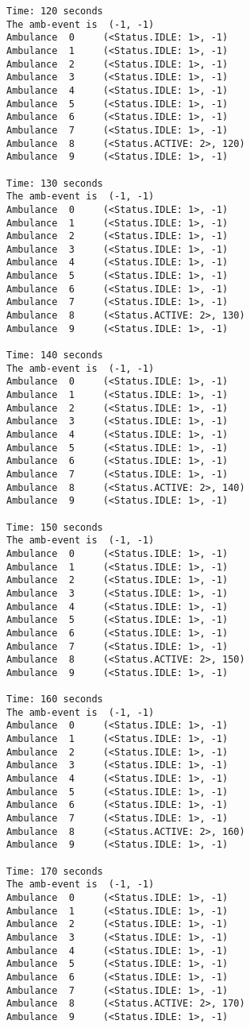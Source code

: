 \documentclass[11pt]{article}
\begin{document}
\begin{Verbatim}[commandchars=\\\{\}]
Time: 120 seconds
The amb-event is  (-1, -1)
Ambulance  0	 (<Status.IDLE: 1>, -1)
Ambulance  1	 (<Status.IDLE: 1>, -1)
Ambulance  2	 (<Status.IDLE: 1>, -1)
Ambulance  3	 (<Status.IDLE: 1>, -1)
Ambulance  4	 (<Status.IDLE: 1>, -1)
Ambulance  5	 (<Status.IDLE: 1>, -1)
Ambulance  6	 (<Status.IDLE: 1>, -1)
Ambulance  7	 (<Status.IDLE: 1>, -1)
Ambulance  8	 (<Status.ACTIVE: 2>, 120)
Ambulance  9	 (<Status.IDLE: 1>, -1)

Time: 130 seconds
The amb-event is  (-1, -1)
Ambulance  0	 (<Status.IDLE: 1>, -1)
Ambulance  1	 (<Status.IDLE: 1>, -1)
Ambulance  2	 (<Status.IDLE: 1>, -1)
Ambulance  3	 (<Status.IDLE: 1>, -1)
Ambulance  4	 (<Status.IDLE: 1>, -1)
Ambulance  5	 (<Status.IDLE: 1>, -1)
Ambulance  6	 (<Status.IDLE: 1>, -1)
Ambulance  7	 (<Status.IDLE: 1>, -1)
Ambulance  8	 (<Status.ACTIVE: 2>, 130)
Ambulance  9	 (<Status.IDLE: 1>, -1)

Time: 140 seconds
The amb-event is  (-1, -1)
Ambulance  0	 (<Status.IDLE: 1>, -1)
Ambulance  1	 (<Status.IDLE: 1>, -1)
Ambulance  2	 (<Status.IDLE: 1>, -1)
Ambulance  3	 (<Status.IDLE: 1>, -1)
Ambulance  4	 (<Status.IDLE: 1>, -1)
Ambulance  5	 (<Status.IDLE: 1>, -1)
Ambulance  6	 (<Status.IDLE: 1>, -1)
Ambulance  7	 (<Status.IDLE: 1>, -1)
Ambulance  8	 (<Status.ACTIVE: 2>, 140)
Ambulance  9	 (<Status.IDLE: 1>, -1)

Time: 150 seconds
The amb-event is  (-1, -1)
Ambulance  0	 (<Status.IDLE: 1>, -1)
Ambulance  1	 (<Status.IDLE: 1>, -1)
Ambulance  2	 (<Status.IDLE: 1>, -1)
Ambulance  3	 (<Status.IDLE: 1>, -1)
Ambulance  4	 (<Status.IDLE: 1>, -1)
Ambulance  5	 (<Status.IDLE: 1>, -1)
Ambulance  6	 (<Status.IDLE: 1>, -1)
Ambulance  7	 (<Status.IDLE: 1>, -1)
Ambulance  8	 (<Status.ACTIVE: 2>, 150)
Ambulance  9	 (<Status.IDLE: 1>, -1)

Time: 160 seconds
The amb-event is  (-1, -1)
Ambulance  0	 (<Status.IDLE: 1>, -1)
Ambulance  1	 (<Status.IDLE: 1>, -1)
Ambulance  2	 (<Status.IDLE: 1>, -1)
Ambulance  3	 (<Status.IDLE: 1>, -1)
Ambulance  4	 (<Status.IDLE: 1>, -1)
Ambulance  5	 (<Status.IDLE: 1>, -1)
Ambulance  6	 (<Status.IDLE: 1>, -1)
Ambulance  7	 (<Status.IDLE: 1>, -1)
Ambulance  8	 (<Status.ACTIVE: 2>, 160)
Ambulance  9	 (<Status.IDLE: 1>, -1)

Time: 170 seconds
The amb-event is  (-1, -1)
Ambulance  0	 (<Status.IDLE: 1>, -1)
Ambulance  1	 (<Status.IDLE: 1>, -1)
Ambulance  2	 (<Status.IDLE: 1>, -1)
Ambulance  3	 (<Status.IDLE: 1>, -1)
Ambulance  4	 (<Status.IDLE: 1>, -1)
Ambulance  5	 (<Status.IDLE: 1>, -1)
Ambulance  6	 (<Status.IDLE: 1>, -1)
Ambulance  7	 (<Status.IDLE: 1>, -1)
Ambulance  8	 (<Status.ACTIVE: 2>, 170)
Ambulance  9	 (<Status.IDLE: 1>, -1)


\end{Verbatim}
\end{document}
